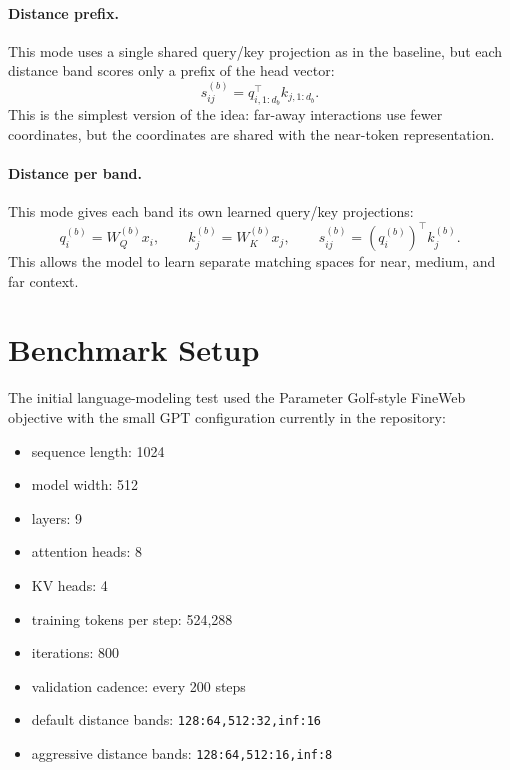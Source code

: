 \documentclass[11pt]{article}
\begin{document}
\paragraph{Distance prefix.}
This mode uses a single shared query/key projection as in the baseline, but each distance band scores only a prefix of the head vector:
\begin{equation}
    s_{ij}^{(b)} =
    q_{i,1:d_b}^\top k_{j,1:d_b}.
\end{equation}
This is the simplest version of the idea: far-away interactions use fewer coordinates, but the coordinates are shared with the near-token representation.

\paragraph{Distance per band.}
This mode gives each band its own learned query/key projections:
\begin{equation}
    q_i^{(b)} = W_Q^{(b)} x_i,\qquad
    k_j^{(b)} = W_K^{(b)} x_j,\qquad
    s_{ij}^{(b)} = \left(q_i^{(b)}\right)^\top k_j^{(b)}.
\end{equation}
This allows the model to learn separate matching spaces for near, medium, and far context.

\section{Benchmark Setup}

The initial language-modeling test used the Parameter Golf-style FineWeb objective with the small GPT configuration currently in the repository:

\begin{itemize}
    \item sequence length: 1024
    \item model width: 512
    \item layers: 9
    \item attention heads: 8
    \item KV heads: 4
    \item training tokens per step: 524,288
    \item iterations: 800
    \item validation cadence: every 200 steps
    \item default distance bands: \texttt{128:64,512:32,inf:16}
    \item aggressive distance bands: \texttt{128:64,512:16,inf:8}
\end{itemize}
\end{document}
